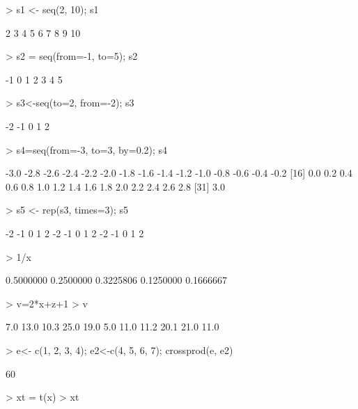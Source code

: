 \documentclass{article}
\begin{document}
\begin{Schunk}
\begin{Sinput}
> s1 <- seq(2, 10); s1 
\end{Sinput}
\begin{Soutput}
[1]  2  3  4  5  6  7  8  9 10
\end{Soutput}
\begin{Sinput}
> s2 = seq(from=-1, to=5); s2
\end{Sinput}
\begin{Soutput}
[1] -1  0  1  2  3  4  5
\end{Soutput}
\begin{Sinput}
> s3<-seq(to=2, from=-2); s3
\end{Sinput}
\begin{Soutput}
[1] -2 -1  0  1  2
\end{Soutput}
\begin{Sinput}
> s4=seq(from=-3, to=3, by=0.2); s4
\end{Sinput}
\begin{Soutput}
 [1] -3.0 -2.8 -2.6 -2.4 -2.2 -2.0 -1.8 -1.6 -1.4 -1.2 -1.0 -0.8 -0.6 -0.4 -0.2
[16]  0.0  0.2  0.4  0.6  0.8  1.0  1.2  1.4  1.6  1.8  2.0  2.2  2.4  2.6  2.8
[31]  3.0
\end{Soutput}
\begin{Sinput}
> s5 <- rep(s3, times=3); s5
\end{Sinput}
\begin{Soutput}
 [1] -2 -1  0  1  2 -2 -1  0  1  2 -2 -1  0  1  2
\end{Soutput}
\begin{Sinput}
> 1/x
\end{Sinput}
\begin{Soutput}
[1] 0.5000000 0.2500000 0.3225806 0.1250000 0.1666667
\end{Soutput}
\begin{Sinput}
> v=2*x+z+1
> v
\end{Sinput}
\begin{Soutput}
 [1]  7.0 13.0 10.3 25.0 19.0  5.0 11.0 11.2 20.1 21.0 11.0
\end{Soutput}
\begin{Sinput}
> e<- c(1, 2, 3, 4); e2<-c(4, 5, 6, 7); crossprod(e, e2) 
\end{Sinput}
\begin{Soutput}
     [,1]
[1,]   60
\end{Soutput}
\begin{Sinput}
> xt = t(x)
> xt
\end{Sinput}
\begin{Soutput}
     [,1] [,2] [,3] [,4] [,5]

\end{Soutput}
\end{Schunk}
\end{document}
